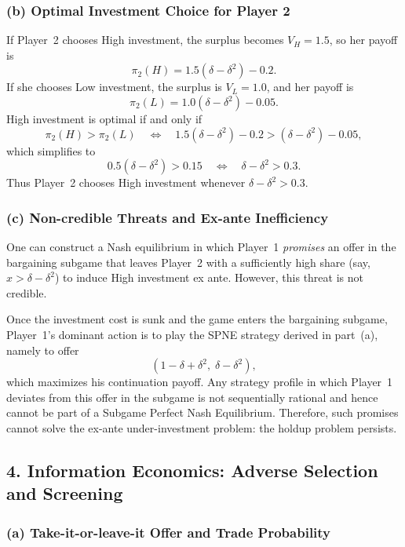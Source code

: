 \documentclass[12pt,a4paper]{article}
\begin{document}
\subsubsection*{(b) Optimal Investment Choice for Player 2}

If Player~2 chooses High investment, the surplus becomes \(V_H = 1.5\), so her payoff is
\[
  \pi_2(H) = 1.5(\delta - \delta^2) - 0.2.
\]
If she chooses Low investment, the surplus is \(V_L = 1.0\), and her payoff is
\[
  \pi_2(L) = 1.0(\delta - \delta^2) - 0.05.
\]
High investment is optimal if and only if
\[
  \pi_2(H) > \pi_2(L)
  \quad\Longleftrightarrow\quad
  1.5(\delta - \delta^2) - 0.2 > (\delta - \delta^2) - 0.05,
\]
which simplifies to
\[
  0.5(\delta - \delta^2) > 0.15
  \quad\Longleftrightarrow\quad
  \delta - \delta^2 > 0.3.
\]
Thus Player~2 chooses High investment whenever \(\delta - \delta^2 > 0.3\).

\subsubsection*{(c) Non-credible Threats and Ex-ante Inefficiency}

One can construct a Nash equilibrium in which Player~1 \emph{promises} an offer in the bargaining
subgame that leaves Player~2 with a sufficiently high share (say, \(x > \delta - \delta^2\)) to
induce High investment ex ante. However, this threat is not credible.

Once the investment cost is sunk and the game enters the bargaining subgame, Player~1's dominant
action is to play the SPNE strategy derived in part~(a), namely to offer
\[
  (1 - \delta + \delta^2,\; \delta - \delta^2),
\]
which maximizes his continuation payoff. Any strategy profile in which Player~1 deviates from this
offer in the subgame is not sequentially rational and hence cannot be part of a Subgame Perfect
Nash Equilibrium. Therefore, such promises cannot solve the ex-ante under-investment problem:
the holdup problem persists.

\bigskip

\subsection*{4. Information Economics: Adverse Selection and Screening}

\subsubsection*{(a) Take-it-or-leave-it Offer and Trade Probability}
\end{document}
